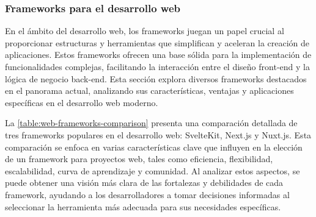 \subsubsection{Frameworks para el desarrollo web}

En el ámbito del desarrollo web, los frameworks juegan un papel crucial al proporcionar estructuras y herramientas que simplifican y aceleran la creación de aplicaciones. Estos frameworks ofrecen una base sólida para la implementación de funcionalidades complejas, facilitando la interacción entre el diseño front-end y la lógica de negocio back-end. Esta sección explora diversos frameworks destacados en el panorama actual, analizando sus características, ventajas y aplicaciones específicas en el desarrollo web moderno.

La \autoref{table:web-frameworks-comparison} presenta una comparación detallada de tres frameworks populares en el desarrollo web: SvelteKit, Next.js y Nuxt.js. Esta comparación se enfoca en varias características clave que influyen en la elección de un framework para proyectos web, tales como eficiencia, flexibilidad, escalabilidad, curva de aprendizaje y comunidad. Al analizar estos aspectos, se puede obtener una visión más clara de las fortalezas y debilidades de cada framework, ayudando a los desarrolladores a tomar decisiones informadas al seleccionar la herramienta más adecuada para sus necesidades específicas.

